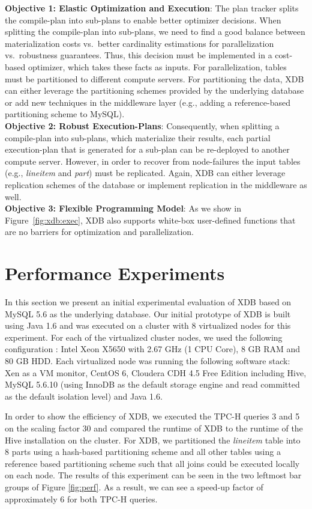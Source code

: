 \documentclass{sig-alternate}
\begin{document}
{\bf Objective 1:  Elastic Optimization and Execution}: The plan tracker splits the compile-plan into sub-plans to enable better optimizer decisions. When splitting the compile-plan into sub-plans, we need to find a good balance between materialization costs vs.\ better cardinality estimations for parallelization vs.\ robustness guarantees. Thus, this decision must be implemented in a cost-based optimizer, which takes these facts as inputs. For parallelization,  tables must be partitioned to different compute servers. For partitioning the data, XDB can either leverage the partitioning schemes provided by the underlying database or add new techniques in the middleware layer (e.g., adding a reference-based partitioning scheme to MySQL).\\

{\bf Objective 2:  Robust Execution-Plans}: Consequently, when splitting a compile-plan into sub-plans, which materialize their results, each partial execution-plan that is generated for a sub-plan can be re-deployed to another compute server. However, in order to recover from node-failures the input tables (e.g., \emph{lineitem} and \emph{part}) must be replicated. Again, XDB can either leverage replication schemes of the database or implement replication in the middleware as well.\\

{\bf Objective 3:  Flexible Programming Model}: As we show in Figure~\ref{fig:xdb:exec}, XDB also supports white-box user-defined functions that are no barriers for optimization and parallelization. 

\section{Performance Experiments}
\label{sec:perf}

In this section we present an initial experimental evaluation of XDB based on MySQL 5.6 as the underlying database. Our initial prototype of XDB is built using Java 1.6 and was executed on a cluster with 8 virtualized nodes for this experiment.  
For each of the virtualized cluster nodes, we used the following configuration : Intel Xeon X5650 with 2.67 GHz (1 CPU Core), 8 GB RAM and 80 GB HDD. Each virtualized node was running the following software stack: Xen as a VM monitor, CentOS 6, Cloudera CDH 4.5 Free Edition including Hive, MySQL 5.6.10 (using InnoDB as the default storage engine and read committed as the default isolation level) and Java 1.6.

In order to show the efficiency of XDB, we executed the TPC-H queries 3 and 5 on the scaling factor 30 and compared the runtime of XDB to the runtime of the Hive installation on the cluster. For XDB, we partitioned the \emph{lineitem} table into 8 parts using a hash-based partitioning scheme and all other tables using a reference based partitioning scheme such that all joins could be executed locally on each node. The results of this experiment can be seen in the two leftmost bar groups of Figure \ref{fig:perf}. As a result, we can see a speed-up factor of approximately 6 for both TPC-H queries.
 
\end{document}
